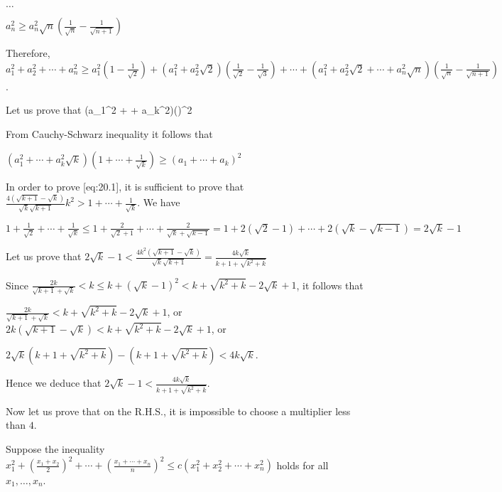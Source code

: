   $\ldots$

  $a_n^2\geq a_n^2\sqrt{n}\left(\frac{1}{\sqrt{n}} - \frac{1}{\sqrt{n + 1}}\right)$

  Therefore, $a_1^2 + a_2^2 + \cdots + a_n^2\geq a_1^2\left(1 - \frac{1}{\sqrt{2}}\right) + (a_1^2 +
  a_2^2\sqrt{2})\left(\frac{1}{\sqrt{2}} - \frac{1}{\sqrt{3}}\right) + \cdots + (a_1^2 + a_2^2\sqrt{2}
  + \cdots + a_n^2\sqrt{n})\left(\frac{1}{\sqrt{n}} - \frac{1}{\sqrt{n  + 1}}\right)$.

  Let us prove that
  \startplaceformula[eq:20.1]
    \startformula
      (a_1^2 + \cdots +
      a_k^2)\geq {}\left(\right)^2
    \stopformula
  \stopplaceformula

  From Cauchy-Schwarz inequality it follows that

  $\left(a_1^2 + \cdots + a_k^2\sqrt{k}\right)\left(1 + \cdots + \frac{1}{\sqrt{k}}\right)\geq (a_1 + \cdots
  + a_k)^2$

  In order to prove [eq:20.1], it is sufficient to prove that $\frac{4(\sqrt{k + 1}
    - \sqrt{k})}{\sqrt{k}\sqrt{k + 1}}k^2 > 1 + \cdots + \frac{1}{\sqrt{k}}$. We have

  $1 + \frac{1}{\sqrt{2}} + \cdots + \frac{1}{\sqrt{k}}\leq 1 + \frac{2}{\sqrt{2} + 1} + \cdots
  + \frac{2}{\sqrt{k} + \sqrt{k- 1}} = 1 + 2(\sqrt{2} - 1) + \cdots + 2(\sqrt{k} - \sqrt{k - 1}) = 2\sqrt{k}
  - 1$

  Let us prove that $2\sqrt{k} - 1 < \frac{4k^2(\sqrt{k + 1} - \sqrt{k})}{\sqrt{k}\sqrt{k  + 1}}
  = \frac{4k\sqrt{k}}{k + 1 + \sqrt{k^2 + k}}$

  Since $\frac{2k}{\sqrt{k + 1} + \sqrt{k}}< k\leq k + \left(\sqrt{k} - 1\right)^2 < k + \sqrt{k^2 + k} -
  2\sqrt{k} + 1$, it follows that

  $\frac{2k}{\sqrt{k + 1} + \sqrt{k}} < k + \sqrt{k^2 + k} - 2\sqrt{k} + 1$, or $2k\left(\sqrt{k + 1}
  - \sqrt{k}\right) < k + \sqrt{k^2 + k} - 2\sqrt{k} + 1$, or

  $2\sqrt{k}\left(k + 1 + \sqrt{k^2 + k}\right) - (k + 1 + \sqrt{k^2 + k}) < 4k\sqrt{k}$.

  Hence we deduce that $2\sqrt{k} - 1 < \frac{4k\sqrt{k}}{k + 1 + \sqrt{k^2 + k}}$.

  Now let us prove that on the R.H.S., it is impossible to choose a multiplier less than $4$.

  Suppose the inequality $x_1^2 + \left(\frac{x_1 + x_2}{2}\right)^2 + \cdots + \left(\frac{x_1 + \cdots +
    x_n}{n}\right)^2 \leq c(x_1^2 + x_2^2 + \cdots + x_n^2)$ holds for all $x_1, \ldots, x_n$.

